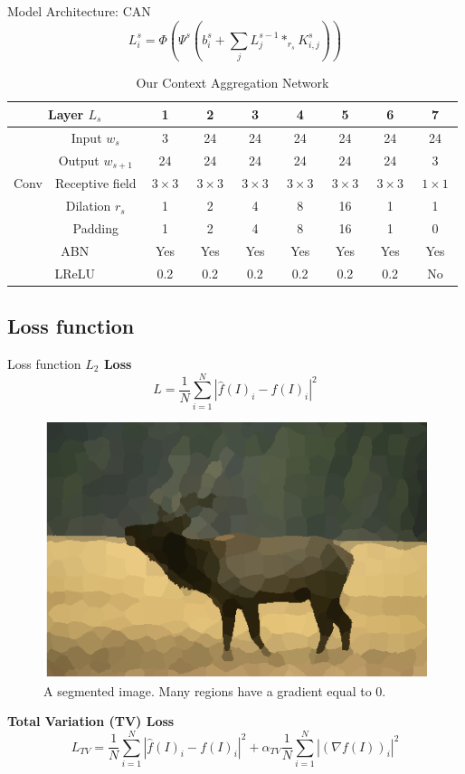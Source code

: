\documentclass[9pt]{beamer}
\begin{document}
\begin{frame}{Model Architecture: CAN}
\begin{equation*}
    L_i^s=\Phi\left(\Psi^s\left(b_i^s+\sum_jL_j^{s-1}*_{r_s}K^s_{i,j}\right)\right)
\end{equation*}
\begin{table}[!ht]
    \centering\scriptsize
    \begin{tabular}{|c|c||c|cccc|cc|}
        \hline
        \multicolumn{2}{|c||}{Layer $L_s$} & 1 & 2 & 3 & 4 & 5 & 6 & 7 \\
        \hline
        \hline
         & Input $w_s$ & 3 & 24 & 24 & 24 & 24 & 24 & 24 \\
         & Output $w_{s+1}$ & 24 & 24 & 24 & 24 & 24 & 24 & 3 \\
        \cline{2-9}
        Conv & Receptive field & $\ 3\times 3\ $ & $\ 3\times 3\ $ & $\ 3\times 3\ $ & $\ 3\times 3\ $ & $\ 3\times 3\ $ & $\ 3\times 3\ $ & $\ 1\times 1\ $ \\
         & Dilation $r_s$ & 1 & 2 & 4 & 8 & 16 & 1 & 1 \\
         & Padding & 1 & 2 & 4 & 8 & 16 & 1 & 0 \\
        \hline
        \multicolumn{2}{|c||}{ABN} & Yes & Yes & Yes & Yes & Yes & Yes & Yes \\
        \hline
        \multicolumn{2}{|c||}{LReLU} & 0.2 & 0.2 & 0.2 & 0.2 & 0.2 & 0.2 & No \\
        \hline
    \end{tabular}
    \caption{Our Context Aggregation Network}
\end{table}

\end{frame}


\subsection{Loss function}
\begin{frame}{Loss function}
\vspace{5mm}
\textbf{$L_2$ Loss}
$$
L=\frac{1}{N}\sum_{i=1}^N |\hat{f}(I)_i-f(I)_i|^2
$$
\vspace{2mm}
\begin{figure}
\centering
\includegraphics[width=.4\textwidth]{pics/illustration1.png}
\caption{A segmented image. Many regions have a gradient equal to $0$.}
\end{figure}
\textbf{Total Variation (TV) Loss}
$$
L_{TV}=\frac{1}{N}\sum_{i=1}^N |\hat{f}(I)_i-f(I)_i|^2+\alpha_{TV}\frac{1}{N}\sum_{i=1}^N|(\nabla f(I))_i|^2
$$

\end{frame}
\end{document}
